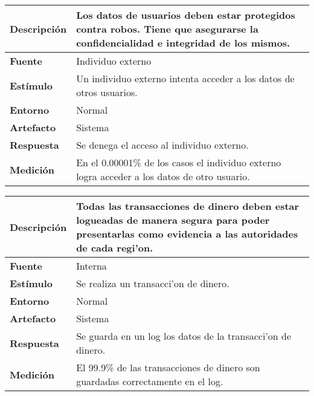 \begin{center}
  \begin{tabular}{| l | p{10cm} | }
    \hline
  \textbf{Descripción} & Los datos de usuarios deben estar protegidos contra robos. Tiene que asegurarse la confidencialidad e integridad de los mismos. \\  \hline
  \textbf{Fuente} & Individuo externo\\  \hline
  \textbf{Estímulo} & Un individuo externo intenta acceder a los datos de otros usuarios.\\  \hline
  \textbf{Entorno} & Normal\\  \hline
  \textbf{Artefacto} & Sistema\\  \hline
  \textbf{Respuesta} & Se denega el acceso al individuo externo.\\  \hline
  \textbf{Medición} & En el 0.00001\% de los casos el individuo externo logra acceder a los datos de otro usuario.\\  \hline
  \end{tabular}
\end{center} 

\begin{center}
  \begin{tabular}{| l | p{10cm} | }
    \hline
  \textbf{Descripción} & Todas las transacciones de dinero deben estar logueadas de manera segura para poder presentarlas como evidencia a las autoridades de cada regi'on.\\  \hline
  \textbf{Fuente} & Interna\\  \hline
  \textbf{Estímulo} & Se realiza un transacci'on de dinero.\\  \hline
  \textbf{Entorno} & Normal\\  \hline
  \textbf{Artefacto} & Sistema\\  \hline
  \textbf{Respuesta} & Se guarda en un log los datos de la transacci'on de dinero.\\  \hline
  \textbf{Medición} & El 99.9\% de las transacciones de dinero son guardadas correctamente en el log.\\  \hline
  \end{tabular}
\end{center} 
